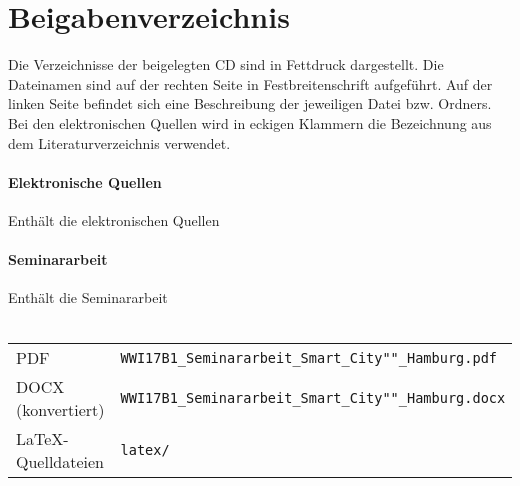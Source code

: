 \section*{Beigabenverzeichnis} 

Die Verzeichnisse der beigelegten CD sind in Fettdruck dargestellt.
Die Dateinamen sind auf der rechten Seite in Festbreitenschrift aufgeführt.
Auf der linken Seite befindet sich eine Beschreibung der jeweiligen Datei bzw. Ordners.
Bei den elektronischen Quellen wird in eckigen Klammern die Bezeichnung aus dem Literaturverzeichnis verwendet.

\paragraph{Elektronische Quellen} Enthält die elektronischen Quellen \\

\paragraph{Seminararbeit} Enthält die Seminararbeit \\\\
\begin{tabular}{>{\raggedleft\arraybackslash}p{4cm}p{8cm}}
	                PDF & \texttt{WWI17B1\_Seminararbeit\_Smart\_City""\_Hamburg.pdf}  \\
	 DOCX (konvertiert) & \texttt{WWI17B1\_Seminararbeit\_Smart\_City""\_Hamburg.docx} \\
	\LaTeX -Quelldateien & \texttt{latex/}
\end{tabular}